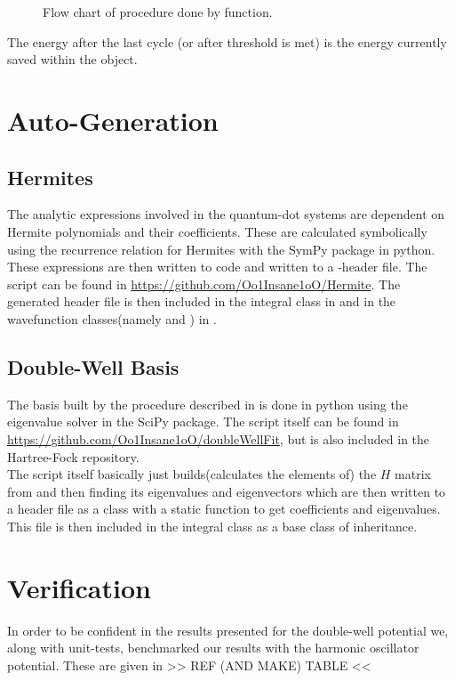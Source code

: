 \begin{figure}[H]
            \caption{Flow chart of procedure done by 
            function.\label{fig:minimizeProc}}
        \end{figure}
    The energy after the last cycle (or after threshold is met) is the energy
    currently saved within the  object.

\section{Auto-Generation\label{sec:auto_generation}}
\subsection{Hermites}
    The analytic expressions involved in the quantum-dot systems are dependent
    on Hermite polynomials and their coefficients. These are calculated
    symbolically using the recurrence relation for Hermites with the SymPy
    package in python. These expressions are then written to \CC code and
    written to a \CC-header file. The script can be found in
    \url{https://github.com/Oo1Insane1oO/Hermite}. The generated header file is
    then included in the integral class in  and in
    the wavefunction classes(namely  and
    ) in .

\subsection{Double-Well Basis}
    The basis built by the procedure described in  is done in
    python using the eigenvalue solver in the SciPy package. The script itself
    can be found in \url{https://github.com/Oo1Insane1oO/doubleWellFit}, but is
    also included in the Hartree-Fock repository. \\
    The script itself basically just builds(calculates the elements of) the $H$
    matrix from  and then finding its eigenvalues and
    eigenvectors which are then written to a \CC header file as a class with a
    static function to get coefficients and eigenvalues. This file is then
    included in the  integral class as a base class of
    inheritance.

\section{Verification\label{sec:verification}}
    In order to be confident in the results presented for the double-well
    potential we, along with unit-tests, benchmarked our results with the
    harmonic oscillator potential. These are given in >> REF (AND MAKE) TABLE
    <<
